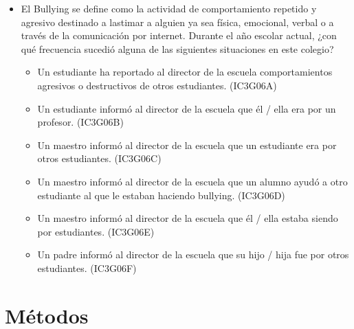 \documentclass[12pt,twoside]{templates/facsothesis}
\providecommand{\tightlist}{%
  \setlength{\itemsep}{0pt}\setlength{\parskip}{0pt}}
\begin{document}
\begin{itemize}
\item
  El Bullying se define como la actividad de comportamiento repetido y agresivo destinado a lastimar a alguien ya sea física, emocional, verbal o a través de la comunicación por internet. Durante el año escolar actual, ¿con qué frecuencia sucedió alguna de las siguientes situaciones en este colegio?

  \begin{itemize}
  \tightlist
  \item
    Un estudiante ha reportado al director de la escuela comportamientos agresivos o destructivos de otros estudiantes. (IC3G06A)
  \item
    Un estudiante informó al director de la escuela que él / ella era por un profesor. (IC3G06B)
  \item
    Un maestro informó al director de la escuela que un estudiante era por otros estudiantes. (IC3G06C)
  \item
    Un maestro informó al director de la escuela que un alumno ayudó a otro estudiante al que le estaban haciendo bullying. (IC3G06D)
  \item
    Un maestro informó al director de la escuela que él / ella estaba siendo por estudiantes. (IC3G06E)
  \item
    Un padre informó al director de la escuela que su hijo / hija fue por otros estudiantes. (IC3G06F)
  \end{itemize}
\end{itemize}

\hypertarget{muxe9todos}{%
\section{Métodos}\label{muxe9todos}}
\end{document}
